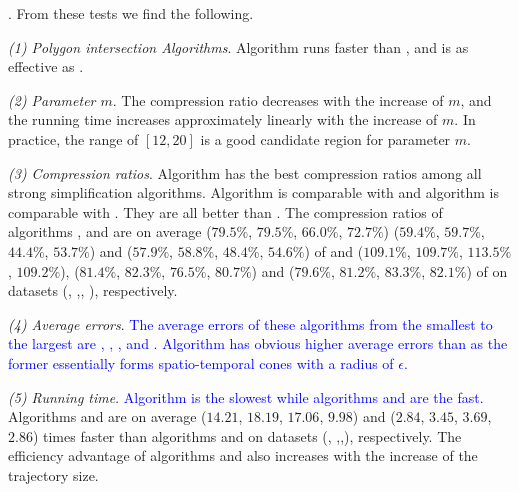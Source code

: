 .
From these tests we find the following.

\sstab \emph{(1) Polygon intersection Algorithms}. Algorithm \rpia runs faster than \cpia, and is as effective as \cpia.

\sstab\emph{(2) Parameter $m$}. The compression ratio decreases with the increase of $m$, and the running time increases approximately linearly with the increase of $m$. In practice, the range of $[12, 20]$ is a good candidate region for parameter $m$.

\sstab\emph{(3) Compression ratios}. Algorithm \cisto has the best compression ratios among all strong simplification algorithms. Algorithm \cist is comparable with \dps and algorithm \cista is comparable with \cisto.
They are all better than \squishe.
The compression ratios of algorithms \cist, \cisto and \cista are on average
($79.5\%$, $79.5\%$, $66.0\%$, $72.7\%$)
{($59.4\%$, $59.7\%$, $44.4\%$, $53.7\%$)} and ($57.9\%$, $58.8\%$, $48.4\%$, $54.6\%$) of \squishe
and ($109.1\%$, $109.7\%$, $113.5\%$, $109.2\%$), {($81.4\%$, $82.3\%$, $76.5\%$, $80.7\%$)} and ($79.6\%$, $81.2\%$, $83.3\%$, $82.1\%$) of \dps on {datasets} (\sercar, \geolife,\mopsi, \pricar), respectively.



\sstab\emph{(4) Average errors}. \textcolor{blue}{The average errors of these algorithms from the smallest to the largest are \squishe, \dps, \cist, \cisto and \cista. Algorithm \cista has obvious higher average errors than \cist as the former essentially forms spatio-temporal cones with a radius of $\epsilon$.}


\sstab\emph{(5) Running time}. \textcolor{blue}{Algorithm \cisto is the slowest while algorithms \cist and \cista are the fast.} Algorithms \cist and \cista are on average
($14.21$, $18.19$, $17.06$, $9.98$) and ($2.84$, $3.45$, $3.69$, $2.86$) times faster than algorithms \dps and \squishe on {datasets} (\sercar, {\geolife},\mopsi,\pricar), respectively.
The efficiency advantage of algorithms \cist and \cista also increases  with the increase of the trajectory size.






